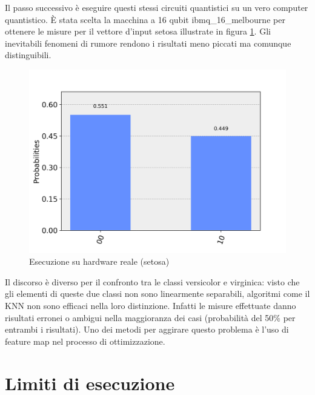Il passo successivo è eseguire questi stessi circuiti quantistici su un vero computer quantistico. 
È stata scelta la macchina a 16 qubit ibmq\_16\_melbourne per ottenere le misure per il 
vettore d'input setosa illustrate in figura \ref{fig:sperimentale_setosa}. 
Gli inevitabili fenomeni di rumore rendono i risultati meno piccati ma comunque 
distinguibili. 

\begin{figure}[h!]
    \centering
    \includegraphics[width=\linewidth]{gfx/misura_setosa_sperimentale}
    \caption{Esecuzione su hardware reale (setosa)}
    \label{fig:sperimentale_setosa}
\end{figure}

Il discorso è diverso per il confronto tra le classi versicolor e 
virginica: visto che gli elementi di queste due classi non sono linearmente 
separabili, algoritmi come il \ac{KNN} non sono efficaci nella loro distinzione. 
Infatti le misure effettuate danno risultati erronei o 
ambigui nella maggioranza dei casi (probabilità del 50\% per entrambi i risultati). 
Uno dei metodi per aggirare questo problema è l'uso di feature map 
\cite{schuld} nel processo di ottimizzazione. 


\section{Limiti di esecuzione}


